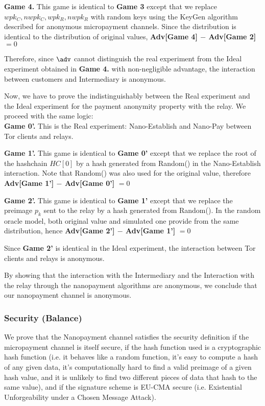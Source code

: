 \textbf{Game 4.} This game is identical to \textbf{Game 3} except that we replace $wpk_C, nwpk_C, wpk_R, nwpk_R$ with random keys using the KeyGen algorithm described for anonymous micropayment channels. Since the distribution is identical to the distribution of original values, \textbf{Adv[Game 4] $-$ Adv[Game 2]} $= 0$

Therefore, since $\adv$ cannot distinguish the real experiment from the Ideal experiment obtained in \textbf{Game 4.} with non-negligible advantage, the interaction between customers and Intermediary is anonymous.

Now, we have to prove the indistinguishably between the Real experiment and the Ideal experiment for the payment anonymity property with the relay.  We proceed with the same logic:\\

\textbf{Game 0'.} This is the Real experiment: Nano-Establish and Nano-Pay between  Tor clients and relays.

\textbf{Game 1'.} This game is identical to \textbf{Game 0'} except that we replace the root of the hashchain $HC[0]$ by a hash generated from Random() in the Nano-Establish interaction. Note that Random() was also used for the original value, therefore \textbf{Adv[Game 1'] $-$ Adv[Game 0']} $= 0$

\textbf{Game 2'.} This game is identical to \textbf{Game 1'} except that we replace the preimage $p_k$ sent to the relay by a hash generated from Random(). In the random oracle model, both original value and simulated one provide from the same distribution, hence \textbf{Adv[Game 2'] $-$ Adv[Game 1']} $= 0$

Since \textbf{Game 2'} is identical in the Ideal experiment, the interaction between Tor clients and relays is anonymous.

By showing that the interaction with the Intermediary and the Interaction with the relay through the nanopayment algorithms are anonymous, we conclude that our nanopayment channel is anonymous.

\subsubsection{Security (Balance)}

We prove that the Nanopayment channel satisfies the security definition if the micropayment channel is itself secure, if the hash function used is a cryptographic hash function (i.e. it behaves like a random function, it's easy to compute a hash of any given data, it's computationally hard to find a valid preimage of a given hash value, and it is unlikely to find two different pieces of data that hash to the same value), and if the signature scheme is EU-CMA secure (i.e. Existential Unforgeability under a Chosen Message Attack).

